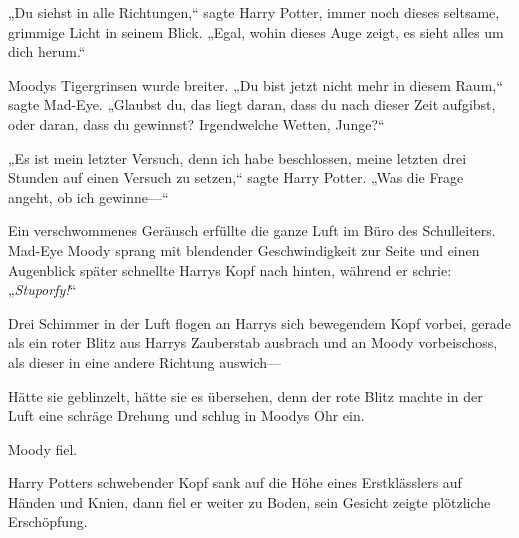 „Du siehst in alle Richtungen,“ sagte Harry Potter, immer noch dieses seltsame, grimmige Licht in seinem Blick. „Egal, wohin dieses Auge zeigt, es sieht alles um dich herum.“

Moodys Tigergrinsen wurde breiter. „Du bist jetzt nicht mehr in diesem Raum,“ sagte Mad-Eye. „Glaubst du, das liegt daran, dass du nach dieser Zeit aufgibst, oder daran, dass du gewinnst? Irgendwelche Wetten, Junge?“

„Es ist mein letzter Versuch, denn ich habe beschlossen, meine letzten drei Stunden auf einen Versuch zu setzen,“ sagte Harry Potter. „Was die Frage angeht, ob ich gewinne—“

Ein verschwommenes Geräusch erfüllte die ganze Luft im Büro des Schulleiters. Mad-Eye Moody sprang mit blendender Geschwindigkeit zur Seite und einen Augenblick später schnellte Harrys Kopf nach hinten, während er schrie: „\emph{Stuporfy!}“

Drei Schimmer in der Luft flogen an Harrys sich bewegendem Kopf vorbei, gerade als ein roter Blitz aus Harrys Zauberstab ausbrach und an Moody vorbeischoss, als dieser in eine andere Richtung auswich—

Hätte sie geblinzelt, hätte sie es übersehen, denn der rote Blitz machte in der Luft eine schräge Drehung und schlug in Moodys Ohr ein.

Moody fiel.

Harry Potters schwebender Kopf sank auf die Höhe eines Erstklässlers auf Händen und Knien, dann fiel er weiter zu Boden, sein Gesicht zeigte plötzliche Erschöpfung.

